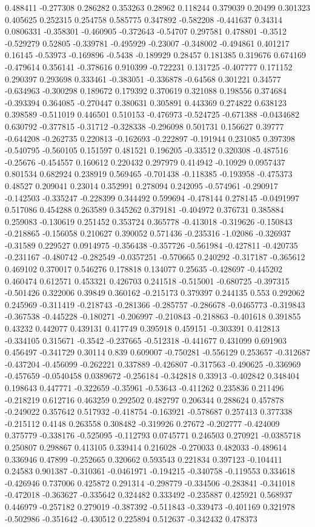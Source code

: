 0.488411 -0.277308 0.286282 0.353263 0.28962 0.118244 0.379039 0.20499 0.301323 0.405625 0.252315 0.254758 0.585775 0.347892 -0.582208 -0.441637 0.34314 0.0806331 -0.358301 -0.460905 -0.372643 -0.54707 0.297581 0.478801 -0.3512 -0.529279 0.52805 -0.339781 -0.495929 -0.23007 -0.348002 -0.494861 0.401217 0.16145 -0.53973 -0.169896 -0.5438 -0.189929 0.28457 0.181385 0.319676 0.674169 -0.479614 0.356141 -0.378616 0.910399 -0.722231 0.131725 -0.407777 0.171152 0.290397 0.293698 0.333461 -0.383051 -0.336878 -0.64568 0.301221 0.34577 -0.634963 -0.300298 0.189672 0.179392 0.370619 0.321088 0.198556 0.374684 -0.393394 0.364085 -0.270447 0.380631 0.305891 0.443369 0.274822 0.638123 0.398589 -0.511019 0.446501 0.510153 -0.476973 -0.524725 -0.671388 -0.0434682 0.630792 -0.377815 -0.31712 -0.328338 -0.296098 0.501731 0.156627 0.39777 -0.644208 -0.262735 0.220813 -0.162693 -0.222897 -0.191944 0.231085 0.397398 -0.540795 -0.560105 0.151597 0.481521 0.196205 -0.33512 0.320308 -0.487516 -0.25676 -0.454557 0.160612 0.220432 0.297979 0.414942 -0.10929 0.0957437 0.801534 0.682924 0.238919 0.569465 -0.701438 -0.118385 -0.193958 -0.475373 0.48527 0.209041 0.23014 0.352991 0.278094 0.242095 -0.574961 -0.290917 -0.142503 -0.335247 -0.228399 0.344492 0.599694 -0.478144 0.278145 -0.0491997 0.517086 0.454288 0.263589 0.345262 0.379181 -0.404972 0.376731 0.385884 0.259083 -0.130619 0.251452 0.353724 0.365778 -0.413018 -0.319626 -0.150843 -0.218865 -0.156058 0.210627 0.390052 0.571436 -0.235316 -1.02086 -0.326937 -0.31589 0.229527 0.0914975 -0.356438 -0.357726 -0.561984 -0.427811 -0.420735 -0.231167 -0.480742 -0.282549 -0.0357251 -0.570665 0.240292 -0.317187 -0.365612 0.469102 0.370017 0.546276 0.178818 0.134077 0.25635 -0.428697 -0.445202 0.460474 0.612571 0.453321 0.426703 0.241518 -0.515001 -0.680725 -0.397315 -0.501426 0.322006 0.39849 0.360162 -0.215173 0.379397 0.244135 0.553 0.292062 0.245969 -0.311419 -0.218743 -0.281366 -0.285757 -0.286678 -0.0465773 -0.319843 -0.367538 -0.445228 -0.180271 -0.206997 -0.210843 -0.218863 -0.401618 0.391855 0.43232 0.442077 0.439131 0.417749 0.395918 0.459151 -0.303391 0.412813 -0.334105 0.315671 -0.3542 -0.237665 -0.512318 -0.441677 0.431099 0.691903 0.456497 -0.341729 0.30114 0.839 0.609007 -0.750281 -0.556129 0.253657 -0.312687 -0.437204 -0.456099 -0.262221 0.337889 -0.426807 -0.317563 -0.490625 -0.336969 -0.457659 -0.0540458 0.0389672 -0.256184 -0.342818 0.33913 -0.402842 0.348404 0.198643 0.447771 -0.322659 -0.35961 -0.53643 -0.411262 0.235836 0.211496 -0.218219 0.612716 0.463259 0.292502 0.482797 0.206344 0.288624 0.457878 -0.249022 0.357642 0.517932 -0.418754 -0.163921 -0.578687 0.257413 0.377338 -0.215112 0.4148 0.263558 0.308482 -0.319926 0.27672 -0.202777 -0.424009 0.375779 -0.338176 -0.525095 -0.112793 0.0745771 0.246503 0.270921 -0.0385718 0.250807 0.298867 0.413105 0.339414 0.216028 -0.270033 0.482033 -0.489614 0.336946 0.47899 -0.252665 0.320662 0.593543 0.221834 0.397123 -0.104411 0.24583 0.901387 -0.310361 -0.0461971 -0.194215 -0.340758 -0.119553 0.334618 -0.426946 0.737006 0.425872 0.291314 -0.298779 -0.334506 -0.283841 -0.341018 -0.472018 -0.363627 -0.335642 0.324482 0.333492 -0.235887 0.425921 0.568937 0.446979 -0.257182 0.279019 -0.387392 -0.511843 -0.339473 -0.401169 0.321978 -0.502986 -0.351642 -0.430512 0.225894 0.512637 -0.342432 0.478373 